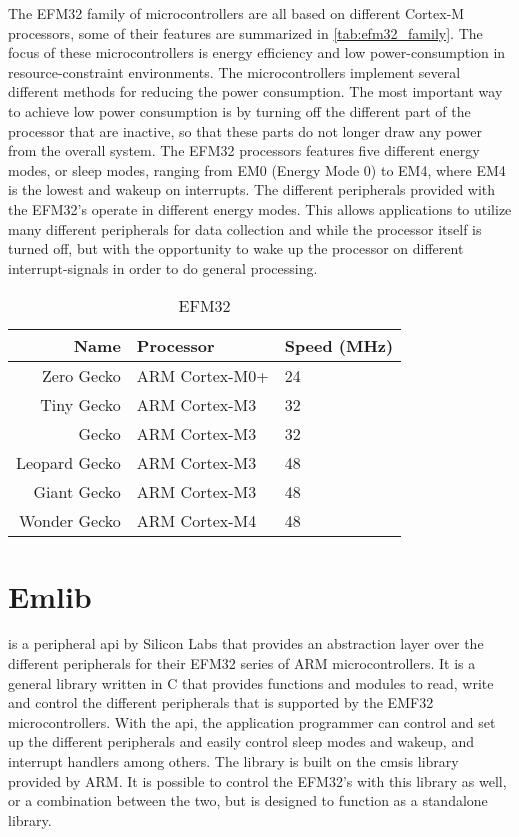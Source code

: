 The EFM32 family of microcontrollers are all based on different Cortex-M processors, some of their
features are summarized in \autoref{tab:efm32_family}.
The focus of these microcontrollers is energy efficiency and low power-consumption in resource-constraint environments.
The microcontrollers implement several different methods for reducing the power consumption.
The most important way to achieve low power consumption is by turning off the different part of the processor that are inactive, so that these parts do not longer draw any power from the overall system.
The EFM32 processors features five different energy modes, or sleep modes, ranging from EM0 (Energy Mode 0) to EM4, where EM4 is the lowest and wakeup on interrupts.
The different peripherals provided with the EFM32's operate in different energy modes.
This allows applications to utilize many different peripherals for data collection and  while the processor itself is turned off, but with the opportunity to wake up the processor on different interrupt-signals in order to do general processing.

\begin{table}
\begin{center}
    \begin{tabular}{r|l|l}
    \textbf{Name} & \textbf{Processor} & \textbf{Speed (MHz)} \\
    \hline
    Zero Gecko    & ARM Cortex-M0+ & 24 \\
    Tiny Gecko    & ARM Cortex-M3  & 32 \\
    Gecko         & ARM Cortex-M3  & 32 \\
    Leopard Gecko & ARM Cortex-M3  & 48 \\
    Giant Gecko   & ARM Cortex-M3  & 48 \\
    Wonder Gecko  & ARM Cortex-M4  & 48 \\
    \end{tabular}
\end{center}
\caption{EFM32}
\label{tab:efm32_family}
\end{table}



\section{Emlib} %
\label{sub:emlib}

\emlib is a peripheral \gls{api} by Silicon Labs that provides an abstraction layer over the different peripherals for their EFM32 series of ARM microcontrollers.
It is a general library written in C that provides functions and modules to read, write and control the different peripherals that is supported by the EMF32 microcontrollers.
With the \gls{api}, the application programmer can control and set up the different peripherals and easily control sleep modes and wakeup, and interrupt handlers among others.
The library is built on the \gls{cmsis} library provided by ARM.
It is possible to control the EFM32's with this library as well, or a combination between the two, but \emlib is designed to function as a standalone library.
